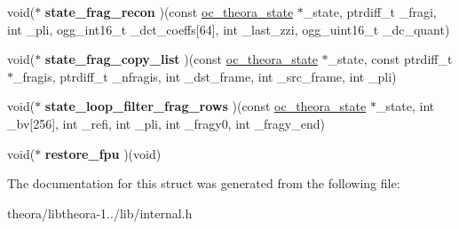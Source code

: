 \begin{DoxyCompactItemize}
\item 
\hypertarget{structoc__base__opt__vtable_ae723a8a8633f0f456d992462a98f3234}{void($\ast$ {\bfseries state\+\_\+frag\+\_\+recon} )(const \hyperlink{structoc__theora__state}{oc\+\_\+theora\+\_\+state} $\ast$\+\_\+state, ptrdiff\+\_\+t \+\_\+fragi, int \+\_\+pli, ogg\+\_\+int16\+\_\+t \+\_\+dct\+\_\+coeffs\mbox{[}64\mbox{]}, int \+\_\+last\+\_\+zzi, ogg\+\_\+uint16\+\_\+t \+\_\+dc\+\_\+quant)}\label{structoc__base__opt__vtable_ae723a8a8633f0f456d992462a98f3234}

\item 
\hypertarget{structoc__base__opt__vtable_a35d5a77efd05a7d58b01a80c32f24947}{void($\ast$ {\bfseries state\+\_\+frag\+\_\+copy\+\_\+list} )(const \hyperlink{structoc__theora__state}{oc\+\_\+theora\+\_\+state} $\ast$\+\_\+state, const ptrdiff\+\_\+t $\ast$\+\_\+fragis, ptrdiff\+\_\+t \+\_\+nfragis, int \+\_\+dst\+\_\+frame, int \+\_\+src\+\_\+frame, int \+\_\+pli)}\label{structoc__base__opt__vtable_a35d5a77efd05a7d58b01a80c32f24947}

\item 
\hypertarget{structoc__base__opt__vtable_a8bca8d0c8068d6106aeda3a5c9310003}{void($\ast$ {\bfseries state\+\_\+loop\+\_\+filter\+\_\+frag\+\_\+rows} )(const \hyperlink{structoc__theora__state}{oc\+\_\+theora\+\_\+state} $\ast$\+\_\+state, int \+\_\+bv\mbox{[}256\mbox{]}, int \+\_\+refi, int \+\_\+pli, int \+\_\+fragy0, int \+\_\+fragy\+\_\+end)}\label{structoc__base__opt__vtable_a8bca8d0c8068d6106aeda3a5c9310003}

\item 
\hypertarget{structoc__base__opt__vtable_a6191ce8448be5b5c4c7e0b2c52be0e18}{void($\ast$ {\bfseries restore\+\_\+fpu} )(void)}\label{structoc__base__opt__vtable_a6191ce8448be5b5c4c7e0b2c52be0e18}

\end{DoxyCompactItemize}


The documentation for this struct was generated from the following file\+:\begin{DoxyCompactItemize}
\item 
theora/libtheora-\/1../lib/internal.\+h\end{DoxyCompactItemize}
